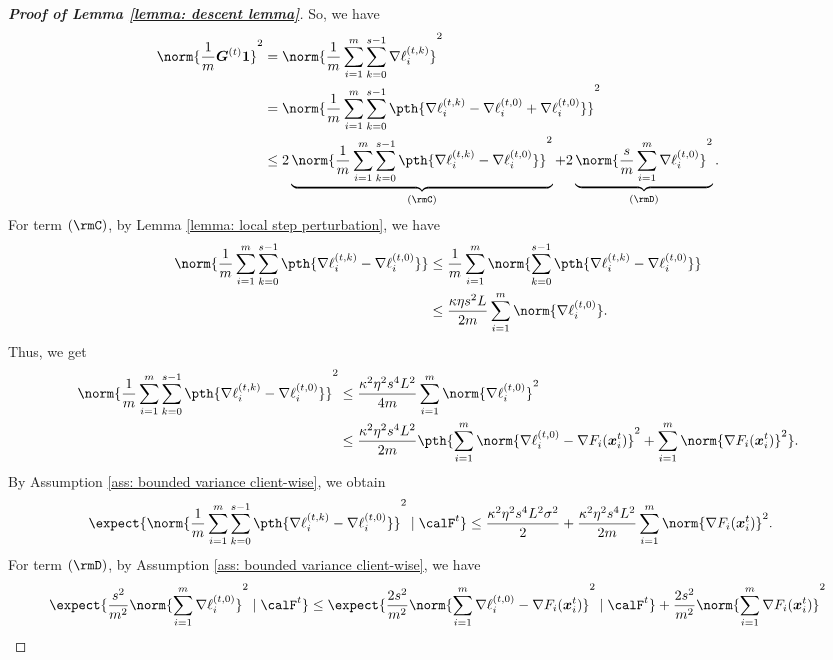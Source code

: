 \documentclass[letterpaper, 10 pt, conference]{ieeeconf}  %
\newcommand{\x}{{\bm x}}
\begin{document}
\begin{proof}[\bf Proof of Lemma \ref{lemma: descent lemma}]
So, we have 
\begin{align*}
\norm{\frac{1}{m} \bm{G}^{(t)} \bm{1}}^2 & =  \norm{\frac{1}{m} \sum_{i=1}^m \sum_{k=0}^{s-1} \nabla \ell_i^{(t,k)}}^2  \\
& =  \norm{\frac{1}{m} \sum_{i=1}^m \sum_{k=0}^{s-1} \pth{\nabla \ell_i^{(t,k)} - \nabla \ell_i^{(t,0)} + \nabla \ell_i^{(t,0)}}}^2 \\
& \le 2 \underbrace{\norm{\frac{1}{m} \sum_{i=1}^m \sum_{k=0}^{s-1} \pth{\nabla \ell_i^{(t,k)} - \nabla \ell_i^{(t,0)}}}^2}_{(\rmC)} + 2 \underbrace{\norm{\frac{s}{m} \sum_{i=1}^m   \nabla \ell_i^{(t,0)}}^2}_{(\rmD)}.  
\end{align*}
\noindent For term $(\rmC)$, %
by Lemma \ref{lemma: local step perturbation}, we have
\begin{align*}
\norm{\frac{1}{m} \sum_{i=1}^m \sum_{k=0}^{s-1} \pth{\nabla \ell_i^{(t,k)} - \nabla \ell_i^{(t,0)}}} 
& \le \frac{1}{m} \sum_{i=1}^m \norm{\sum_{k=0}^{s-1} \pth{\nabla \ell_i^{(t,k)} - \nabla \ell_i^{(t,0)}}} \\
&  \le  \frac{\kappa \eta s^2L}{2m} \sum_{i=1}^m \norm{\nabla \ell_i^{(t,0)}}. 
\end{align*}
Thus, we get 
\begin{align*}
\norm{\frac{1}{m} \sum_{i=1}^m \sum_{k=0}^{s-1} \pth{\nabla \ell_i^{(t,k)} - \nabla \ell_i^{(t,0)}}}^2  
&\le \frac{\kappa^2 \eta^2 s^4 L^2}{4m} \sum_{i=1}^m \norm{\nabla \ell_i^{(t,0)}}^2 \\
& \le \frac{\kappa^2 \eta^2 s^4 L^2}{2m} \pth{\sum_{i=1}^m \norm{\nabla \ell_i^{(t,0)} - \nabla F_i(\x_i^t)}^2 + \sum_{i=1}^m \norm{\nabla F_i(\x_i^t)}^2}. 
\end{align*}
By Assumption \ref{ass: bounded variance client-wise}, we obtain 
\begin{align*}
\expect{\norm{\frac{1}{m} \sum_{i=1}^m \sum_{k=0}^{s-1} \pth{\nabla \ell_i^{(t,k)} - \nabla \ell_i^{(t,0)}}}^2  \mid \calF^{t}}   
& \le  \frac{\kappa^2 \eta^2 s^4 L^2\sigma^2}{2} + \frac{\kappa^2 \eta^2 s^4 L^2}{2m} \sum_{i=1}^m \norm{\nabla F_i(\x_i^t)}^2. 
\end{align*}
\noindent For term $(\rmD)$,  by Assumption \ref{ass: bounded variance client-wise}, we have 
\begin{align*}
\expect{\frac{s^2}{m^2} \norm{\sum_{i=1}^m   \nabla \ell_i^{(t,0)}}^2\mid \calF^{t}}  
& \le  \expect{ \frac{2s^2}{m^2}\norm{\sum_{i=1}^m  \nabla \ell_i^{(t,0)} - \nabla F_i(\x_i^t)}^2 \mid \calF^{t}}+ \frac{2s^2}{m^2}\norm{\sum_{i=1}^m  \nabla F_i(\x_i^t)}^2\\

\end{align*}
\end{proof}
\end{document}
